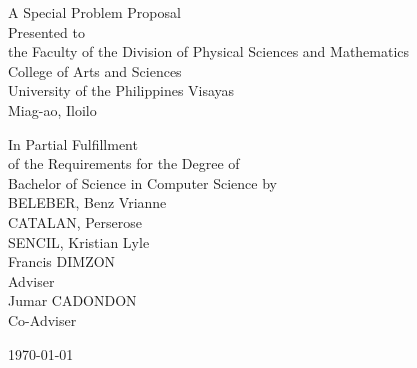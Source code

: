 \begin{titlepage}
\centering


\vspace{1.75cm}
A Special Problem Proposal\\
Presented to\\
the Faculty of the Division of Physical Sciences and Mathematics\\
College of Arts and Sciences\\
University of the Philippines Visayas\\
Miag-ao, Iloilo

\vspace{1.75cm}
In Partial Fulfillment\\
of the Requirements for the Degree of\\
Bachelor of Science in Computer Science
\vspace{1.75cm}
by\\

\vspace{1cm}
BELEBER, Benz Vrianne  \\
CATALAN, Perserose  \\
SENCIL, Kristian Lyle  \\

\vspace{1.75cm}
Francis DIMZON \\
Adviser\\
Jumar CADONDON \\
Co-Adviser

\vspace{1.75cm}
\today
\end{titlepage}
